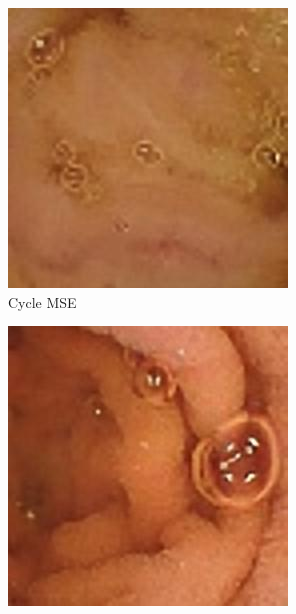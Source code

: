 \begin{figure}[H]
  \begin{subfigure}[b]{0.32\textwidth}
    \includegraphics[width=\textwidth]{Chapter7/cycle_mse_9.jpg}
    \caption{Cycle MSE}
  \end{subfigure}
  \begin{subfigure}[b]{0.32\textwidth}
    \includegraphics[width=\textwidth]{Chapter7/cycle_mse_445.jpg}

\end{subfigure}
\end{figure}
